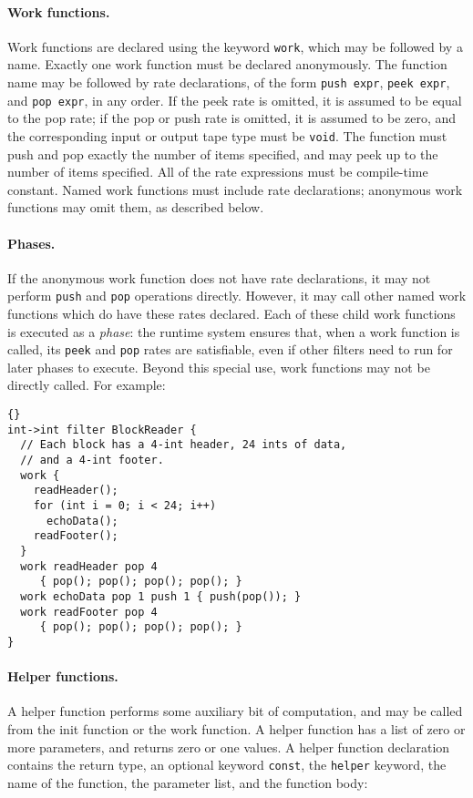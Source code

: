 \documentclass[11pt]{article}
\begin{document}
\paragraph{Work functions.}  Work functions are declared using the
keyword \lstinline|work|, which may be followed by a name.  Exactly
one work function must be declared anonymously.  The function name may
be followed by rate declarations, of the form \lstinline|push expr|,
\lstinline|peek expr|, and \lstinline|pop expr|, in any order.  If the
peek rate is omitted, it is assumed to be equal to the pop rate; if
the pop or push rate is omitted, it is assumed to be zero, and the
corresponding input or output tape type must be \lstinline|void|.  The
function must push and pop exactly the number of items specified, and
may peek up to the number of items specified.  All of the rate
expressions must be compile-time constant.  Named work functions must
include rate declarations; anonymous work functions may omit them, as
described below.

\paragraph{Phases.}  If the anonymous work function does not have rate
declarations, it may not perform \lstinline|push| and \lstinline|pop|
operations directly.  However, it may call other named work functions
which do have these rates declared.  Each of these child work
functions is executed as a \emph{phase}: the runtime system ensures
that, when a work function is called, its \lstinline|peek| and
\lstinline|pop| rates are satisfiable, even if other filters need to
run for later phases to execute.  Beyond this special use, work
functions may not be directly called.  For example:

\begin{lstlisting}{}
int->int filter BlockReader {
  // Each block has a 4-int header, 24 ints of data,
  // and a 4-int footer.
  work {
    readHeader();
    for (int i = 0; i < 24; i++)
      echoData();
    readFooter();
  }
  work readHeader pop 4
     { pop(); pop(); pop(); pop(); }
  work echoData pop 1 push 1 { push(pop()); }
  work readFooter pop 4
     { pop(); pop(); pop(); pop(); }
}
\end{lstlisting}

\paragraph{Helper functions.}  A helper function performs some
auxiliary bit of computation, and may be called from the init function
or the work function.  A helper function has a list of zero or more
parameters, and returns zero or one values.  A helper function
declaration contains the return type, an optional keyword
\lstinline|const|, the \lstinline|helper| keyword, the name of the
function, the parameter list, and the function body:
\end{document}
